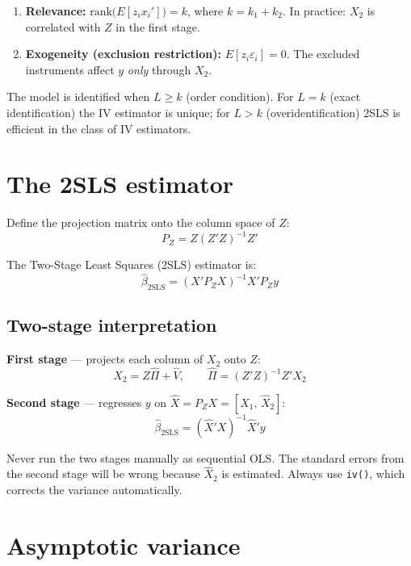 \begin{enumerate}
  \item \textbf{Relevance:}
        $\mathrm{rank}\bigl(E[z_i x_i']\bigr) = k$, where $k = k_1 + k_2$.
        In practice: $X_2$ is correlated with $Z$ in the first stage.

  \item \textbf{Exogeneity (exclusion restriction):}
        $E[z_i \varepsilon_i] = 0$.
        The excluded instruments affect $y$ \emph{only} through $X_2$.
\end{enumerate}

The model is identified when $L \geq k$ (order condition). For
$L = k$ (exact identification) the IV estimator is unique; for $L > k$
(overidentification) 2SLS is efficient in the class of IV estimators.

\section{The 2SLS estimator}

Define the projection matrix onto the column space of $Z$:
\[
  P_Z = Z(Z'Z)^{-1}Z'
\]

The Two-Stage Least Squares (2SLS) estimator is:
\[
  \boxed{\hat{\beta}_{\mathrm{2SLS}} = (X'P_Z X)^{-1} X'P_Z y}
\]

\subsection*{Two-stage interpretation}

\textbf{First stage} --- projects each column of $X_2$ onto $Z$:
\[
  X_2 = Z\hat{\Pi} + \hat{V}, \qquad \hat{\Pi} = (Z'Z)^{-1}Z'X_2
\]

\textbf{Second stage} --- regresses $y$ on $\hat{X} = P_Z X = [X_1,\, \hat{X}_2]$:
\[
  \hat{\beta}_{\mathrm{2SLS}} = (\hat{X}'X)^{-1}\hat{X}'y
\]

\begin{aviso}
  Never run the two stages manually as sequential OLS. The standard errors
  from the second stage will be wrong because $\hat{X}_2$ is estimated.
  Always use \lstinline{iv()}, which corrects the variance automatically.
\end{aviso}

\section{Asymptotic variance}


